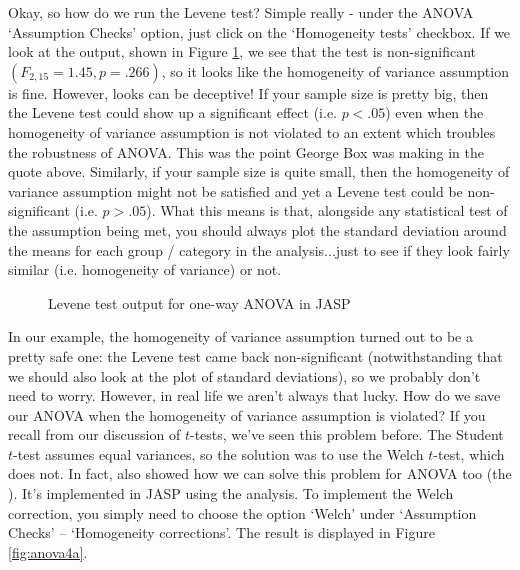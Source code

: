 Okay, so how do we run the Levene test? Simple really - under the ANOVA `Assumption Checks' option, just click on the `Homogeneity tests' checkbox. If we look at the output, shown in Figure \ref{fig:anova4}, we see that the test is non-significant $(F_{2,15} = 1.45, p = .266)$, so it looks like the homogeneity of variance assumption is fine. However, looks can be deceptive! If your sample size is pretty big, then the Levene test could show up a significant effect (i.e. $p<.05$) even when the homogeneity of variance assumption is not violated to an extent which troubles the robustness of ANOVA. This was the point George Box was making in the quote above. Similarly, if your sample size is quite small, then the homogeneity of variance assumption might not be satisfied and yet a Levene test could be non-significant (i.e. $p>.05$). What this means is that, alongside any statistical test of the assumption being met, you should always plot the standard deviation around the means for each group / category in the analysis...just to see if they look fairly similar (i.e. homogeneity of variance) or not.

\begin{figure}[htb]
\begin{center}
\caption{Levene test output for one-way ANOVA in JASP}
\HR
\label{fig:anova4}
\end{center}
\end{figure}


In our example, the homogeneity of variance assumption turned out to be a pretty safe one: the Levene test came back non-significant (notwithstanding that we should also look at the plot of standard deviations), so we probably don't need to worry. However, in real life we aren't always that lucky. How do we save our ANOVA when the homogeneity of variance assumption is violated? If you recall from our discussion of $t$-tests, we've seen this problem before. The Student $t$-test assumes equal variances, so the solution was to use the Welch $t$-test, which does not. In fact, \textcite{Welch1951} also showed how we can solve this problem for ANOVA too (the ). It's implemented in JASP using the  analysis. To implement the Welch correction, you simply need to choose the option `Welch' under `Assumption Checks' -- `Homogeneity corrections'.  The result is displayed in Figure \ref{fig:anova4a}.


